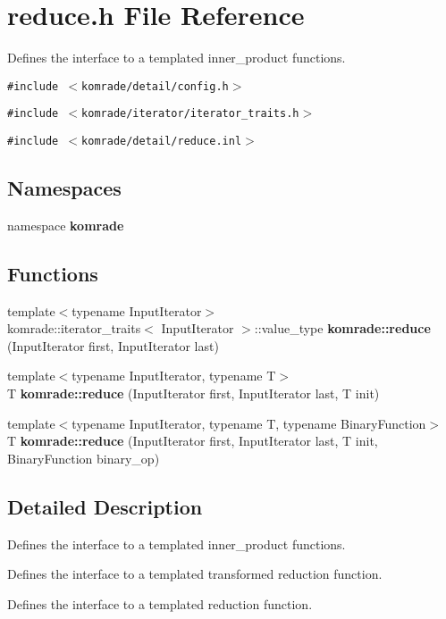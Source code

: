 \section{reduce.h File Reference}
\label{reduce_8h}
Defines the interface to a templated inner\_\-product functions. 

{\tt \#include $<$komrade/detail/config.h$>$}\par
{\tt \#include $<$komrade/iterator/iterator\_\-traits.h$>$}\par
{\tt \#include $<$komrade/detail/reduce.inl$>$}\par
\subsection*{Namespaces}
\begin{CompactItemize}
\item 
namespace {\bf komrade}
\end{CompactItemize}
\subsection*{Functions}
\begin{CompactItemize}
\item 
{\footnotesize template$<$typename InputIterator$>$ }\\komrade::iterator\_\-traits$<$ InputIterator $>$::value\_\-type {\bf komrade::reduce} (InputIterator first, InputIterator last)
\item 
{\footnotesize template$<$typename InputIterator, typename T$>$ }\\T {\bf komrade::reduce} (InputIterator first, InputIterator last, T init)
\item 
{\footnotesize template$<$typename InputIterator, typename T, typename BinaryFunction$>$ }\\T {\bf komrade::reduce} (InputIterator first, InputIterator last, T init, BinaryFunction binary\_\-op)
\end{CompactItemize}


\subsection{Detailed Description}
Defines the interface to a templated inner\_\-product functions. 

Defines the interface to a templated transformed reduction function.

Defines the interface to a templated reduction function.